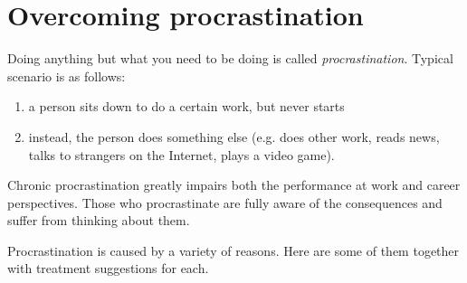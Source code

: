 \documentclass[11pt]{article}
\theoremstyle{remark}
\theoremstyle{definition}
\begin{document}
\section{Overcoming procrastination}


Doing anything but what you need to be doing is called \textit{procrastination}. Typical scenario is as follows:

\begin{enumerate}

\item a person sits down to do a certain work, but never starts

\item instead, the person does something else (e.g. does other work, reads news, talks to strangers on the Internet, plays a video game).

\end{enumerate}


Chronic procrastination greatly impairs both the performance at work and career perspectives. Those who procrastinate are fully aware of the consequences and suffer from thinking about them. 



Procrastination is caused by a variety of reasons. Here are some of them together with treatment suggestions for each.
\end{document}
